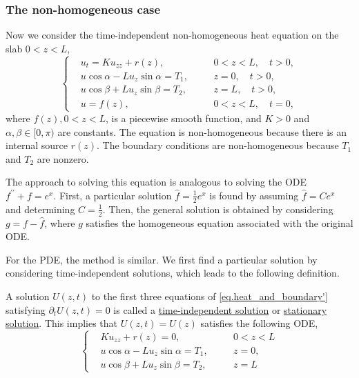 \subsubsection{The non-homogeneous case} Now we consider the time-independent non-homogeneous heat equation on the slab $0<z<L$,
\begin{equation}\label{eq.heat_and_boundary'}
    \left\{\begin{aligned} 
        &u_t=K u_{z z} + r(z), && 0<z<L, \quad t>0, 
        \\ 
        &u \cos \alpha-L u_z \sin \alpha=T_1,\quad && z=0, \quad t>0, 
        \\ 
        &u \cos \beta+L u_z \sin \beta=T_2, && z=L, \quad t>0, 
        \\
        &u=f(z), && 0<z<L, \quad t=0,
    \end{aligned}\right.
\end{equation}
where $f(z), 0<z<L$, is a piecewise smooth function, and $K>0$ and $\alpha, \beta \in[0, \pi)$ are constants. The equation is non-homogeneous because there is an internal source $r(z)$. The boundary conditions are non-homogeneous because $T_1$ and $T_2$ are nonzero. 

The approach to solving this equation is analogous to solving the ODE $f^{\prime \prime}+f=e^x$. First, a particular solution $\hat{f}=\frac{1}{2} e^x$ is found by assuming $\hat{f}=C e^x$ and determining $C=\frac{1}{2}$. Then, the general solution is obtained by considering $g=f-\hat{f}$, where $g$ satisfies the homogeneous equation associated with the original ODE.

For the PDE, the method is similar. We first find a particular solution by considering time-independent solutions, which leads to the following definition.


\begin{definition}
    A solution $U(z, t)$ to the first three equations of \eqref{eq.heat_and_boundary'} satisfying $\partial_t U(z, t)=0$ is called a \underline{time-independent solution} or \underline{stationary solution}. This implies that $U(z, t)=U(z)$ satisfies the following ODE,
    \begin{equation}\label{eq.time_independent_sol}
        \left\{\begin{aligned} 
            &K u_{z z} + r(z) = 0, && 0<z<L
            \\ 
            &u \cos \alpha-L u_z \sin \alpha=T_1,\quad && z=0, 
            \\ 
            &u \cos \beta+L u_z \sin \beta=T_2, && z=L
        \end{aligned}\right.
    \end{equation}
\end{definition}

